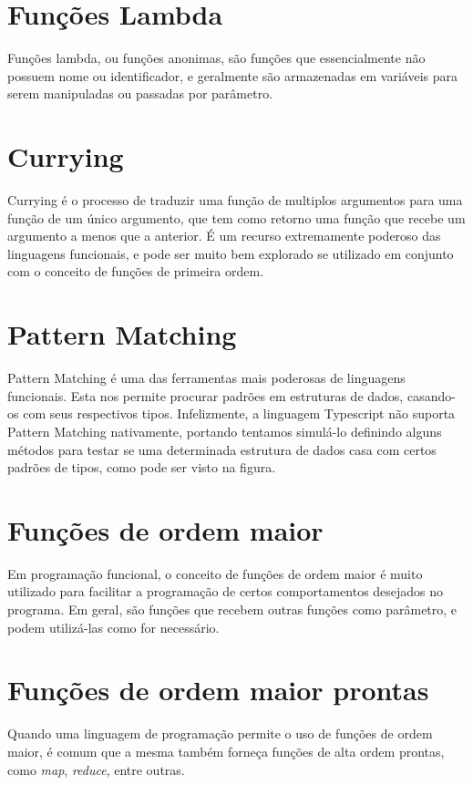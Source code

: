 \documentclass[rel_mlp]{iiufrgs}
\numberwithin{figure}{chapter}
\begin{document}
\section{Funções Lambda}

Funções lambda, ou funções anonimas, são funções que essencialmente não possuem nome ou identificador, e geralmente são armazenadas em variáveis para serem manipuladas ou passadas por parâmetro.


\section{Currying}

Currying é o processo de traduzir uma função de multiplos argumentos para uma função de um único argumento, que tem como retorno uma função que recebe um argumento a menos que a anterior. É um recurso extremamente poderoso das linguagens funcionais, e pode ser muito bem explorado se utilizado em conjunto com o conceito de funções de primeira ordem.

\section{Pattern Matching}

Pattern Matching é uma das ferramentas mais poderosas de linguagens funcionais. Esta nos permite procurar padrões em estruturas de dados, casando-os com seus respectivos tipos. Infelizmente, a linguagem Typescript não suporta Pattern Matching nativamente, portando tentamos simulá-lo definindo alguns métodos para testar se uma determinada estrutura de dados casa com certos padrões de tipos, como pode ser visto na figura.


\section{Funções de ordem maior}

Em programação funcional, o conceito de funções de ordem maior é muito utilizado para facilitar a programação de certos comportamentos desejados no programa. Em geral, são funções que recebem outras funções como parâmetro, e podem utilizá-las como for necessário.


\section{Funções de ordem maior prontas}

Quando uma linguagem de programação permite o uso de funções de ordem maior, é comum que a mesma também forneça funções de alta ordem prontas, como \textit{map}, \textit{reduce}, entre outras. 
\end{document}
